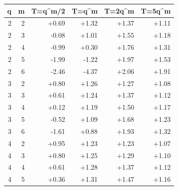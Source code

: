 \begin{tabular}{rrrrrr}
\toprule
q & m & T=q^m/2 & T=q^m & T=2q^m & T=5q^m \\
\midrule
2 & 2 & +0.69 & +1.32 & +1.37 & +1.11 \\
2 & 3 & -0.08 & +1.01 & +1.55 & +1.18 \\
2 & 4 & -0.99 & +0.30 & +1.76 & +1.31 \\
2 & 5 & -1.99 & -1.22 & +1.97 & +1.53 \\
2 & 6 & -2.46 & -4.37 & +2.06 & +1.91 \\
3 & 2 & +0.80 & +1.26 & +1.27 & +1.08 \\
3 & 3 & +0.61 & +1.24 & +1.37 & +1.12 \\
3 & 4 & +0.12 & +1.19 & +1.50 & +1.17 \\
3 & 5 & -0.52 & +1.09 & +1.68 & +1.23 \\
3 & 6 & -1.61 & +0.88 & +1.93 & +1.32 \\
4 & 2 & +0.95 & +1.23 & +1.23 & +1.07 \\
4 & 3 & +0.80 & +1.25 & +1.29 & +1.10 \\
4 & 4 & +0.61 & +1.28 & +1.37 & +1.12 \\
4 & 5 & +0.36 & +1.31 & +1.47 & +1.16 \\
\bottomrule
\end{tabular}
